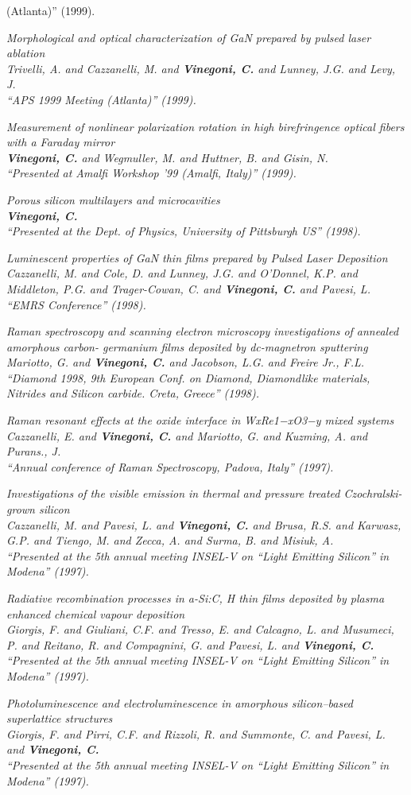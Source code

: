 (Atlanta)''  (1999). \item \it Morphological and optical characterization of GaN prepared by pulsed laser ablation \\ Trivelli, A. and Cazzanelli, M. and {\bf Vinegoni, C.} and Lunney, J.G. and Levy, J. \\ ``APS 1999 Meeting (Atlanta)''  (1999). \item \it Measurement of nonlinear polarization rotation in high birefringence optical fibers with a Faraday mirror \\ {\bf Vinegoni, C.} and Wegmuller, M. and Huttner, B. and Gisin, N. \\ ``Presented at Amalfi Workshop ’99 (Amalfi, Italy)''  (1999). \item \it Porous silicon multilayers and microcavities \\ {\bf Vinegoni, C.} \\ ``Presented at the Dept. of Physics, University of Pittsburgh US''  (1998). \item \it Luminescent properties of GaN thin films prepared by Pulsed Laser Deposition \\ Cazzanelli, M. and Cole, D. and Lunney, J.G. and O'Donnel, K.P. and Middleton, P.G. and Trager-Cowan, C. and {\bf Vinegoni, C.} and Pavesi, L. \\ ``EMRS Conference''  (1998). \item \it Raman spectroscopy and scanning electron microscopy investigations of annealed amorphous carbon- germanium films deposited by dc-magnetron sputtering \\ Mariotto, G. and {\bf Vinegoni, C.} and Jacobson, L.G. and Freire Jr., F.L. \\ ``Diamond 1998, 9th European Conf. on Diamond, Diamondlike materials, Nitrides and Silicon carbide. Creta, Greece''  (1998). \item \it Raman resonant effects at the oxide interface in WxRe1−xO3−y mixed systems \\ Cazzanelli, E. and {\bf Vinegoni, C.} and Mariotto, G. and Kuzming, A. and Purans., J. \\ ``Annual conference of Raman Spectroscopy, Padova, Italy''  (1997). \item \it Investigations of the visible emission in thermal and pressure treated Czochralski-grown silicon \\ Cazzanelli, M. and Pavesi, L. and {\bf Vinegoni, C.} and Brusa, R.S. and Karwasz, G.P. and Tiengo, M. and Zecca, A. and Surma, B. and Misiuk, A. \\ ``Presented at the 5th annual meeting INSEL-V on “Light Emitting Silicon” in Modena''  (1997). \item \it Radiative recombination processes in a-Si:C, H thin films deposited by plasma enhanced chemical vapour deposition \\ Giorgis, F. and Giuliani, C.F. and Tresso, E. and Calcagno, L. and Musumeci, P. and Reitano, R. and Compagnini, G. and Pavesi, L. and {\bf Vinegoni, C.} \\ ``Presented at the 5th annual meeting INSEL-V on “Light Emitting Silicon” in Modena''  (1997). \item \it Photoluminescence and electroluminescence in amorphous silicon–based superlattice structures \\ Giorgis, F. and Pirri, C.F. and Rizzoli, R. and Summonte, C.  and Pavesi, L. and {\bf Vinegoni, C.} \\ ``Presented at the 5th annual meeting INSEL-V on “Light Emitting Silicon” in Modena''  (1997). 